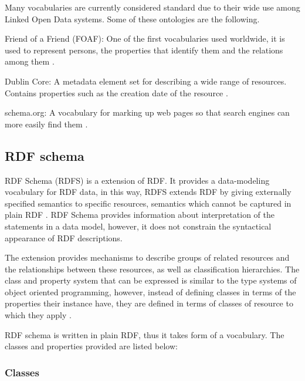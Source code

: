 Many vocabularies are currently considered standard due to their wide use among Linked Open Data systems. Some of these ontologies are the following.

\begin{description}
	\item{Friend of a Friend (FOAF):} One of the first vocabularies used worldwide, it is used to represent persons, the properties that identify them and the relations among them \cite{foafspec}.
	
	\item{Dublin Core:} A metadata element set for describing a wide range of resources. Contains properties such as the creation date of the resource \cite{dublincorespec}.
	
	\item{schema.org: } A vocabulary for marking up web pages so that search engines can more easily find them \cite{schemaspec}.
\end{description}

\subsection*{RDF schema}

RDF Schema (RDFS) is a extension of RDF. It provides a data-modeling vocabulary for RDF data, in this way, RDFS extends RDF by giving externally specified semantics to specific resources, semantics which cannot be captured in plain RDF \cite{rdfs1}. RDF Schema provides information about interpretation of the statements in a data model, however, it does not constrain the syntactical appearance of RDF descriptions.

The extension provides mechanisms to describe groups of related resources and the relationships between these resources, as well as classification hierarchies. The class and property system that can be expressed is similar to the type systems of object oriented programming, however, instead of defining classes in terms of the properties their instance have, they are defined in terms of classes of resource to which they apply \cite{rdfschema}.

RDF schema is written in plain RDF, thus it takes form of a vocabulary. The classes and properties provided are listed below:

\subsubsection*{Classes}

